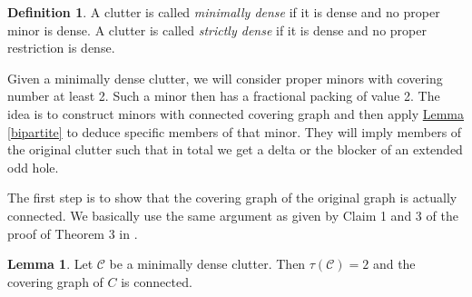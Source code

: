 \documentclass[a4paper, 12pt, twoside=false]{scrbook}
\theoremstyle{definition}
\newtheorem*{definition}{Definition}
\newtheorem{lemma}[theorem]{Lemma}
\begin{document}
   \begin{definition}
       A clutter is called \emph{minimally dense} if it is dense and no proper minor is dense.
       A clutter is called \emph{strictly dense} if it is dense and no proper restriction is dense.
   \end{definition}

   Given a minimally dense clutter, we will consider proper minors with covering number at least 2.
   Such a minor then has a fractional packing of value 2.
   The idea is to construct minors with connected covering graph and then apply \hyperref[bipartite]{Lemma \ref*{bipartite}} to deduce specific members of that minor.
   They will imply members of the original clutter such that in total we get a delta or the blocker of an extended odd hole.

   The first step is to show that the covering graph of the original graph is actually connected.
   We basically use the same argument as given by Claim 1 and 3 of the proof of Theorem 3 in \cite{deltas}.

   \begin{lemma}\label{connectivity}
       Let $\mathcal{C}$ be a minimally dense clutter.
       Then $\tau(\mathcal{C})=2$ and the covering graph of $C$ is connected.
   \end{lemma}
\end{document}
